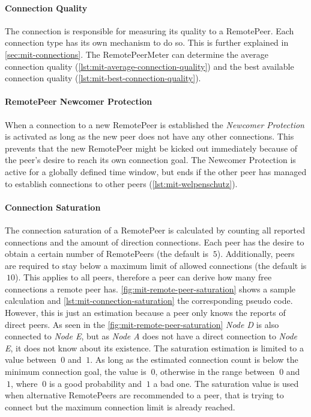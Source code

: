 \paragraph{Connection Quality}
The connection is responsible for measuring its quality to a RemotePeer. Each connection type has its own mechanism to do so. This is further explained in \vref{sec:mit-connections}.
The RemotePeerMeter can determine the average connection quality (\vref{lst:mit-average-connection-quality}) and the best available connection quality (\vref{lst:mit-best-connection-quality}).

\paragraph{RemotePeer Newcomer Protection}
When a connection to a new RemotePeer is established the \textit{Newcomer Protection} is activated as long as the new peer does not have any other connections. This prevents that the new RemotePeer might be kicked out immediately because of the peer's desire to reach its own connection goal. The Newcomer Protection is active for a globally defined time window, but ends if the other peer has managed to establish connections to other peers (\vref{lst:mit-welpenschutz}).

\paragraph{Connection Saturation}
The connection saturation of a RemotePeer is calculated by counting all reported connections and the amount of direction connections. Each peer has the desire to obtain a certain number of RemotePeers (the default is $\ 5 $). Additionally, peers are required to stay below a maximum limit of allowed connections (the default is $\ 10 $). This applies to all peers, therefore a peer can derive how many free connections a remote peer has. \vref{fig:mit-remote-peer-saturation} shows a sample calculation and \vref{lst:mit-connection-saturation} the corresponding pseudo code. 
However, this is just an estimation because a peer only knows the reports of direct peers. As seen in the \vref{fig:mit-remote-peer-saturation} \textit{Node D} is also connected to \textit{Node E}, but as \textit{Node A} does not have a direct connection to \textit{Node E}, it does not know about its existence.
The saturation estimation is limited to a value between $\ 0 $ and $\ 1 $. As long as the estimated connection count is below the minimum connection goal, the value is $\ 0 $, otherwise in the range between $\ 0 $ and $\ 1 $, where $\ 0 $ is a good probability and $\ 1 $ a bad one.
The saturation value is used when alternative RemotePeers are recommended to a peer, that is trying to connect but the maximum connection limit is already reached.


